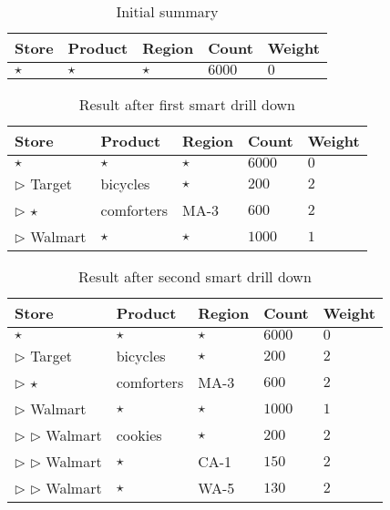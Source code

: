 \begin{example}
\begin{table}
\scriptsize
\centering
\begin{tabular}{| l | l | l | l | l |}
\hline Store & Product & Region & Count & Weight \\
\hline
$\star$ & $\star$ & $\star$ & $6000$ & $0$ \\ \hline
\end{tabular}
\caption{Initial summary}\label{table:introexample0}
\vspace{-10pt}
\end{table}

\begin{table}
\scriptsize
\centering
\begin{tabular}{| l | l | l | l | l |}
\hline Store & Product & Region & Count & Weight \\
\hline
$\star$ & $\star$ & $\star$ & $6000$ & $0$ \\ \hline
$\triangleright$ Target & bicycles & $\star$ & $200$ & $2$ \\ \hline
$\triangleright$ $\star$ & comforters & MA-3 & $600$ & $2$ \\ \hline
$\triangleright$ Walmart & $\star$ & $\star$ & $1000$ & $1$ \\ \hline
\end{tabular}
\caption{Result after first smart drill down}\label{table:introexample}
\vspace{-20pt}
\end{table}

\begin{table}
\vspace{-10pt}
\scriptsize
\centering
\begin{tabular}{| l | l | l | l | l |}
\hline Store & Product & Region & Count & Weight \\
\hline
$\star$ & $\star$ & $\star$ & $6000$ & $0$ \\  \cline{1-5}
$\triangleright$ Target & bicycles & $\star$ & $200$ & $2$ \\ \cline{1-5}
$\triangleright$ $\star$ & comforters & MA-3 & $600$ & $2$ \\ \cline{1-5}
$\triangleright$ Walmart & $\star$ & $\star$ & $1000$ & $1$ \\ \cline{2-5}
$\triangleright$ $\triangleright$ Walmart & cookies & $\star$ & $200$ & $2$ \\ \cline{2-5}
$\triangleright$ $\triangleright$ Walmart & $\star$ & CA-1 & $150$ & $2$ \\ \cline{2-5}
$\triangleright$ $\triangleright$ Walmart & $\star$ & WA-5 & $130$ & $2$ \\ \hline
\end{tabular}
\caption{Result after second smart drill down} \label{table:introexample2}
\vspace{-10pt}
\end{table}


\end{example}
